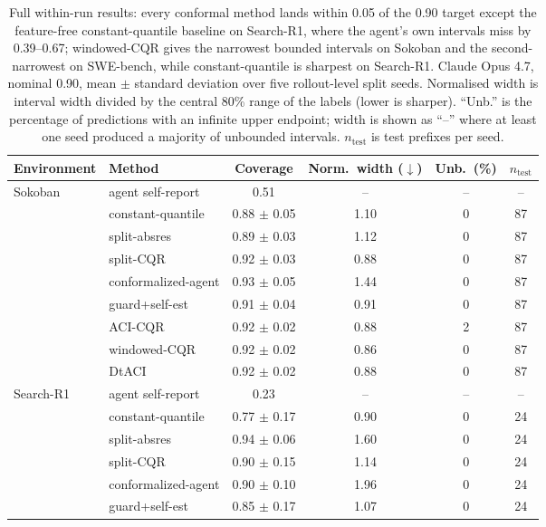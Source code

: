 \documentclass{article}
\begin{document}
\begin{table}[t]
  \caption{Full within-run results: every conformal method lands within 0.05 of the
  0.90 target except the feature-free constant-quantile baseline on Search-R1, where
  the agent's own intervals miss by 0.39--0.67; windowed-CQR gives the narrowest
  bounded intervals on Sokoban and the second-narrowest on SWE-bench, while
  constant-quantile is sharpest on Search-R1. Claude Opus 4.7, nominal 0.90, mean
  $\pm$ standard deviation over five rollout-level split seeds.
  Normalised width is interval width divided by the central 80\% range of the labels
  (lower is sharper). ``Unb.'' is the percentage of predictions with an infinite upper
  endpoint; width is shown as ``--'' where at least one seed produced a majority of
  unbounded intervals. $n_{\mathrm{test}}$ is test prefixes per seed.}
  \label{tab:a2}
  \centering
  \small
  \begin{tabular}{llcccc}
    \toprule
    Environment & Method & Coverage & Norm.\ width ($\downarrow$) & Unb.\ (\%) & $n_{\mathrm{test}}$ \\
    \midrule
    Sokoban & agent self-report & 0.51 & -- & -- & -- \\
     & constant-quantile & 0.88 $\pm$ 0.05 & 1.10 & 0 & 87 \\
     & split-absres & 0.89 $\pm$ 0.03 & 1.12 & 0 & 87 \\
     & split-CQR & 0.92 $\pm$ 0.03 & 0.88 & 0 & 87 \\
     & conformalized-agent & 0.93 $\pm$ 0.05 & 1.44 & 0 & 87 \\
     & guard+self-est & 0.91 $\pm$ 0.04 & 0.91 & 0 & 87 \\
     & ACI-CQR & 0.92 $\pm$ 0.02 & 0.88 & 2 & 87 \\
     & windowed-CQR & 0.92 $\pm$ 0.02 & 0.86 & 0 & 87 \\
     & DtACI & 0.92 $\pm$ 0.02 & 0.88 & 0 & 87 \\
    \midrule
    Search-R1 & agent self-report & 0.23 & -- & -- & -- \\
     & constant-quantile & 0.77 $\pm$ 0.17 & 0.90 & 0 & 24 \\
     & split-absres & 0.94 $\pm$ 0.06 & 1.60 & 0 & 24 \\
     & split-CQR & 0.90 $\pm$ 0.15 & 1.14 & 0 & 24 \\
     & conformalized-agent & 0.90 $\pm$ 0.10 & 1.96 & 0 & 24 \\
     & guard+self-est & 0.85 $\pm$ 0.17 & 1.07 & 0 & 24 \\

\end{tabular}
\end{table}
\end{document}
